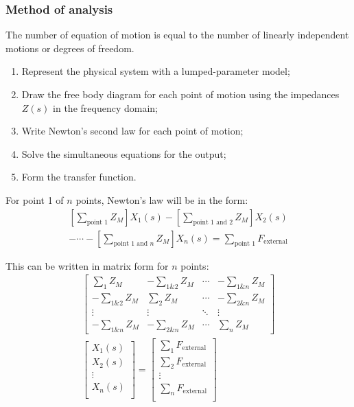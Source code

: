 \documentclass[10pt, twocolumn]{article}
\begin{document}
\subsubsection{Method of analysis}
The number of equation of motion is equal to the number of linearly independent motions or degrees of freedom.

\begin{enumerate}
  \item Represent the physical system with a lumped-parameter model;
  \item Draw the free body diagram for each point of motion using the impedances \(Z(s)\) in the frequency domain;
  \item Write Newton's second law for each point of motion;
  \item Solve the simultaneous equations for the output;
  \item Form the transfer function.
\end{enumerate}

For point 1 of \(n\) points, Newton's law will be in the form:
\begin{multline*}
  \left[ \sum_\text{point 1}{Z_M} \right] X_1(s) - \left[ \sum_\text{point 1 and 2}{Z_M} \right] X_2(s)\\
  - \cdots - \left[ \sum_{\text{point 1 and } n}{Z_M} \right] X_n(s) = \sum_\text{point 1}{F_\text{external}}
\end{multline*}

This can be written in matrix form for \(n\) points:
\begin{multline*}
  \begin{bmatrix}
    \sum_1 {Z_M}       & - \sum_{1\&2}{Z_M} & \cdots & - \sum_{1\&n}{Z_M} \\
    - \sum_{1\&2}{Z_M} & \sum_2 {Z_M}       & \cdots & - \sum_{2\&n}{Z_M} \\
    \vdots             & \vdots             & \ddots & \vdots             \\
    - \sum_{1\&n}{Z_M} & -\sum_{2\&n}{Z_M}  & \cdots & \sum_n{Z_M}
  \end{bmatrix} \\
  \begin{bmatrix}
    X_1(s) \\
    X_2(s) \\
    \vdots \\
    X_n(s) \\
  \end{bmatrix}
  =
  \begin{bmatrix}
    \sum_1{F_\text{external}} \\
    \sum_2{F_\text{external}} \\
    \vdots                    \\
    \sum_n{F_\text{external}} \\
  \end{bmatrix}
\end{multline*}
\end{document}

